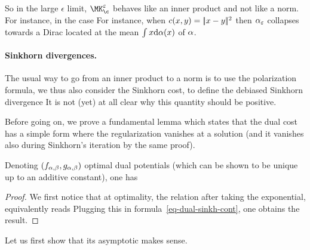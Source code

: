 So in the large $\epsilon$ limit, $\MK_\c^\epsilon$ behaves like an inner product and not like a norm. For instance, in the case 
For instance, when $c(x,y)=|\!| x-y |\!|^2$ then $\alpha_\varepsilon$ collapses towards a Dirac located at the mean $\int x \mathrm{d}\alpha(x)$ of $\alpha$.

\paragraph{Sinkhorn divergences.}

The usual way to go from an inner product to a norm is to use the polarization formula, we thus also consider the Sinkhorn cost, to define the debiased Sinkhorn divergence
It is not (yet) at all clear why this quantity should be positive. 

Before going on, we prove a fundamental lemma which states that the dual cost has a simple form where the regularization vanishes at a solution (and it vanishes also during Sinkhorn's iteration by the same proof).

\begin{lem}
	Denoting $(f_{\alpha,\beta},g_{\alpha,\beta})$ optimal dual potentials (which can be shown to be unique up to an additive constant), one has
\end{lem}
\begin{proof}
	We first notice that at optimality, the relation 
	after taking the exponential, equivalently reads
	Plugging this in formula~\eqref{eq-dual-sinkh-cont}, one obtains the result.
\end{proof}


%
Let us first show that its asymptotic makes sense.

